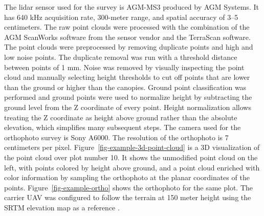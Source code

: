 The \gls{lidar} sensor used for the survey is AGM-MS3 produced by AGM Systems.
It has 640 kHz acquisition rate, 300-meter range, and spatial accuracy of 3–5 centimeters.
The raw point clouds were processed with the combination of the AGM ScanWorks software from the sensor vendor and the TerraScan software.
The point clouds were preprocessed by removing duplicate points and high and low noise points.
The duplicate removal was run with a threshold distance between points of 1 mm.
Noise was removed by visually inspecting the point cloud and manually selecting height thresholds to cut off points that are lower than the ground or higher than the canopies.
Ground point classification was performed and ground points were used to normalize height by subtracting the ground level from the Z coordinate of every point.
Height normalization allows treating the Z coordinate as height above ground rather than the absolute elevation, which simplifies many subsequent steps.
The camera used for the orthophoto survey is Sony A6000.
The resolution of the orthophoto is 7 centimeters per pixel.
Figure~\ref{fig-example-3d-point-cloud} is a 3D visualization of the point cloud over plot number 10.
It shows the unmodified point cloud on the left, with points colored by height above ground, and a point cloud enriched with color information by sampling the orthophoto at the planar coordinates of the points.
Figure~\ref{fig-example-ortho} shows the orthophoto for the same plot.
The carrier UAV was configured to follow the terrain at 150 meter height using the SRTM elevation map as a reference \citep{farrShuttleRadarTopography2000}.

